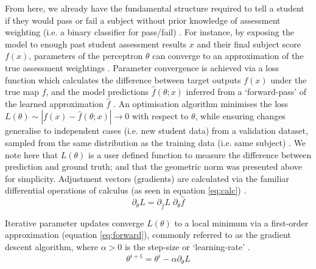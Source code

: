 From here, we already have the fundamental structure required to tell a student if they would pass or fail a subject without prior knowledge of assessment weighting
(i.e. a binary classifier for pass/fail) \cite{rosenblatt1957}. For instance, by exposing the model to enough past student assessment results $x$ and their final subject score $f(x)$, parameters of the perceptron $\theta$ can converge to an approximation of the true assessment weightings \cite{Lundervold2019}. Parameter convergence is achieved via a loss function which calculates the difference between target outputs $f(x)$ under the true map $f$, and the model predictions $\hat{f}(\theta; x)$ inferred from a `forward-pass' of the learned approximation $\hat{f}$ \cite{Bertels2019}. An optimisation algorithm minimises the loss $L(\theta) \sim |f(x)-\hat{f}(\theta; x)| \to 0$ with respect to $\theta$, while ensuring changes generalise to independent cases (i.e. new student data) from a validation dataset, sampled from the same distribution as the training data (i.e. same subject) \cite{Maier2019}. We note here that $L(\theta)$ is a user defined function to measure the difference between prediction and ground truth; and that the geometric norm was presented above for simplicity. Adjustment vectors (gradients) are calculated via the familiar differential operations of calculus (as seen in equation \ref{eq:calc}) \cite{Maier2019}.
\begin{equation}
\partial_{\theta} L = \partial_{\hat{f}}  L \; \partial_{\theta} \hat{f}
\label{eq:calc}
\end{equation}

Iterative parameter updates converge $L(\theta)$ to a local minimum via a first-order approximation (equation \ref{eq:forward}), commonly referred to as the gradient descent algorithm, where $\alpha>0$ is the step-size or `learning-rate' \cite{Maier2019}.
\begin{equation}
\theta^{i+1} = \theta^{i} - \alpha \partial_{\theta} L 
\label{eq:forward}
\end{equation}

